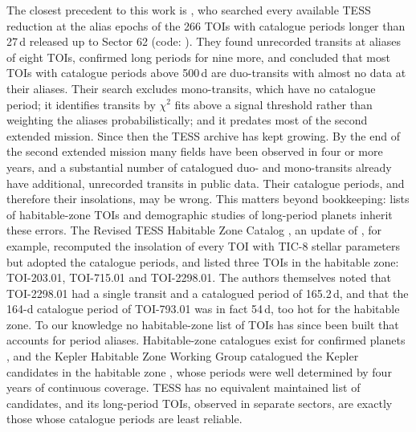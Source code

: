 \documentclass[fleqn,usenatbib]{mnras}
\begin{document}
The closest precedent to this work is \citet{Bass2025}, who searched every available TESS reduction at the alias epochs of the 266 TOIs with catalogue periods longer than 27\,d released up to Sector 62 (code: \citealt{Bass2024}). They found unrecorded transits at aliases of eight TOIs, confirmed long periods for nine more, and concluded that most TOIs with catalogue periods above 500\,d are duo-transits with almost no data at their aliases. Their search excludes mono-transits, which have no catalogue period; it identifies transits by $\chi^2$ fits above a signal threshold rather than weighting the aliases probabilistically; and it predates most of the second extended mission. Since then the TESS archive has kept growing. By the end of the second extended mission many fields have been observed in four or more years, and a substantial number of catalogued duo- and mono-transits already have additional, unrecorded transits in public data. Their catalogue periods, and therefore their insolations, may be wrong. This matters beyond bookkeeping: lists of habitable-zone TOIs and demographic studies of long-period planets inherit these errors. The Revised TESS Habitable Zone Catalog \citep{Kaltenegger2021}, an update of \citet{Kaltenegger2019}, for example, recomputed the insolation of every TOI with TIC-8 stellar parameters but adopted the catalogue periods, and listed three TOIs in the habitable zone: TOI-203.01, TOI-715.01 and TOI-2298.01. The authors themselves noted that TOI-2298.01 had a single transit and a catalogued period of 165.2\,d, and that the 164-d catalogue period of TOI-793.01 was in fact 54\,d, too hot for the habitable zone. To our knowledge no habitable-zone list of TOIs has since been built that accounts for period aliases. Habitable-zone catalogues exist for confirmed planets \citep{Hill2023}, and the Kepler Habitable Zone Working Group catalogued the Kepler candidates in the habitable zone \citep{Kane2016}, whose periods were well determined by four years of continuous coverage. TESS has no equivalent maintained list of candidates, and its long-period TOIs, observed in separate sectors, are exactly those whose catalogue periods are least reliable.
\end{document}
